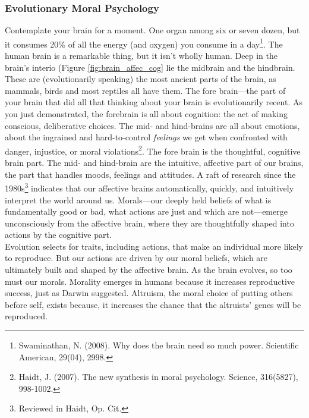 \subsubsection{Evolutionary Moral Psychology}
Contemplate your brain for a moment. One organ among six or seven dozen, but it consumes 20\% of all the energy (and oxygen) you consume in a day\footnote{Swaminathan, N. (2008). Why does the brain need so much power. Scientific American, 29(04), 2998.}. The human brain is a remarkable thing, but it isn't wholly human. Deep in the brain's interio (Figure \ref{fig:brain_affec_cog} lie the midbrain and the hindbrain. These are (evolutionarily speaking) the most ancient parts of the brain, as mammals, birds and most reptiles all have them. The fore brain---the part of your brain that did all that thinking about your brain is evolutionarily recent. As you just demonstrated, the forebrain is all about cognition: the act of making conscious, deliberative choices. The mid- and hind-brains are all about emotions, about the ingrained and hard-to-control \emph{feelings} we get when confronted with danger, injustice, or moral  violations\footnote{Haidt, J. (2007). The new synthesis in moral psychology. Science, 316(5827), 998-1002.}. The fore brain is the thoughtful, cognitive brain part. The mid- and hind-brain are the intuitive, affective part of our brains, the part that handles moods, feelings and attitudes. A raft of research since the 1980s\footnote{Reviewed in Haidt, Op. Cit.} indicates that our affective brains automatically, quickly, and intuitively interpret the world around us. Morals---our deeply held beliefs of what is fundamentally good or bad, what actions are just and which are not---emerge unconsciously from the affective brain, where they are thoughtfully shaped into actions by the cognitive part.\\
 
Evolution selects for traits, including actions, that make an individual more likely to reproduce. But our actions are driven by our moral beliefs, which are ultimately built and shaped by the affective brain. As the brain evolves, so too must our morals. Morality emerges in humans because it increases reproductive success, just as Darwin suggested. Altruism, the moral choice of putting others before self, exists because, it increases the chance that the altruists' genes will be reproduced.\\

